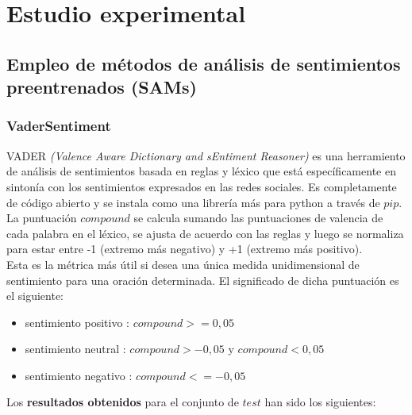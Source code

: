 \documentclass[a4paper,12pt]{report}
\begin{document}
\chapter{Estudio experimental}

\section{Empleo de métodos de análisis de sentimientos preentrenados (SAMs)}



\subsection{VaderSentiment}

{\setlength{\parindent}{0cm}
VADER \textit{(Valence Aware Dictionary and sEntiment Reasoner)} es una herramiento de análisis de sentimientos basada en reglas y léxico que está específicamente en sintonía con los sentimientos expresados en las redes sociales. Es completamente de código abierto y se instala como una librería más para python a través de $pip$.}
\vspace{2mm}\\
La puntuación $compound$ se calcula sumando las puntuaciones de valencia de cada palabra en el léxico, se ajusta de acuerdo con las reglas y luego se normaliza para estar entre -1 (extremo más negativo) y +1 (extremo más positivo).
\vspace{2mm}\\
Esta es la métrica más útil si desea una única medida unidimensional de sentimiento para una oración determinada. El significado de dicha puntuación es el siguiente:

\begin{itemize}
\item sentimiento positivo : $compound >= 0,05 $
\item sentimiento neutral : $compound > -0,05$ y $compound < 0,05$
\item sentimiento negativo : $compound <= -0,05$  
\end{itemize}

{\setlength{\parindent}{0cm}
Los \textbf{resultados obtenidos} para el conjunto de $test$ han sido los siguientes: }
\end{document}
